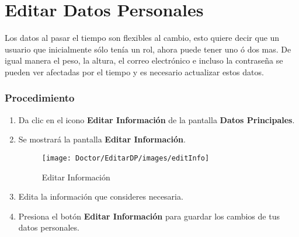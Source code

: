 \section{Editar Datos Personales}

Los datos al pasar el tiempo son flexibles al cambio, esto quiere decir que un usuario que inicialmente sólo tenía un rol, ahora puede tener uno ó dos mas. De igual manera el peso, la altura, el correo electrónico e incluso la contraseña se pueden ver afectadas por el tiempo y es necesario actualizar estos datos.

\subsubsection{Procedimiento}
\begin{enumerate}
	
	\item Da clic en el icono \textbf{Editar Información} de la pantalla \textbf{Datos Principales}.

	\item Se mostrará la pantalla \textbf{Editar Información}.
	
	\begin{figure}[!htbp]
		\hypertarget{fig:editInfo}{\hspace{1pt}}
		\begin{center}
			\texttt{[image: Doctor/EditarDP/images/editInfo]}
			\caption{Editar Información}
			\label{fig:editInfo}
		\end{center}
	\end{figure}

	\item Edita la información que consideres necesaria.
	
	\item Presiona el botón \textbf{Editar Información} para guardar los cambios de tus datos personales.

\end{enumerate}

